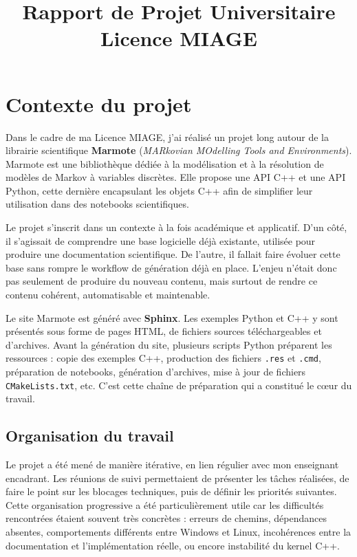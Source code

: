 \documentclass[a4paper,12pt,twoside]{article}
\title{Rapport de Projet Universitaire \\ Licence MIAGE}
\begin{document}
\pagedegarde
\newpage

\tableofcontents
\newpage

\section{Contexte du projet}

Dans le cadre de ma Licence MIAGE, j'ai réalisé un projet long autour de la librairie scientifique \textbf{Marmote} (\emph{MARkovian MOdelling Tools and Environments}). Marmote est une bibliothèque dédiée à la modélisation et à la résolution de modèles de Markov à variables discrètes. Elle propose une API C++ et une API Python, cette dernière encapsulant les objets C++ afin de simplifier leur utilisation dans des notebooks scientifiques.

Le projet s'inscrit dans un contexte à la fois académique et applicatif. D'un côté, il s'agissait de comprendre une base logicielle déjà existante, utilisée pour produire une documentation scientifique. De l'autre, il fallait faire évoluer cette base sans rompre le workflow de génération déjà en place. L'enjeu n'était donc pas seulement de produire du nouveau contenu, mais surtout de rendre ce contenu cohérent, automatisable et maintenable.

Le site Marmote est généré avec \textbf{Sphinx}. Les exemples Python et C++ y sont présentés sous forme de pages HTML, de fichiers sources téléchargeables et d'archives. Avant la génération du site, plusieurs scripts Python préparent les ressources : copie des exemples C++, production des fichiers \texttt{.res} et \texttt{.cmd}, préparation de notebooks, génération d'archives, mise à jour de fichiers \texttt{CMakeLists.txt}, etc. C'est cette chaîne de préparation qui a constitué le cœur du travail.

\subsection*{Organisation du travail}

Le projet a été mené de manière itérative, en lien régulier avec mon enseignant encadrant. Les réunions de suivi permettaient de présenter les tâches réalisées, de faire le point sur les blocages techniques, puis de définir les priorités suivantes. Cette organisation progressive a été particulièrement utile car les difficultés rencontrées étaient souvent très concrètes : erreurs de chemins, dépendances absentes, comportements différents entre Windows et Linux, incohérences entre la documentation et l'implémentation réelle, ou encore instabilité du kernel C++.
\end{document}
